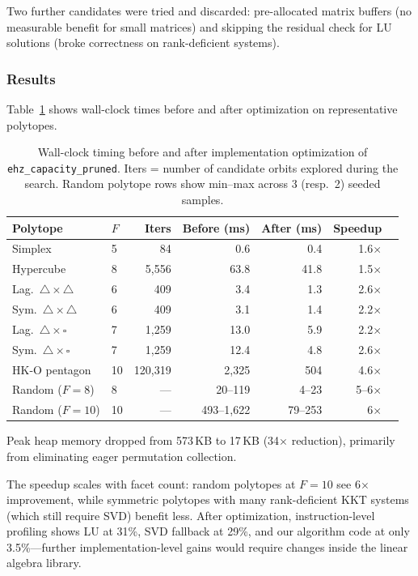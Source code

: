 Two further candidates were tried and discarded: pre-allocated matrix buffers
(no measurable benefit for small matrices) and skipping the residual check
for LU solutions (broke correctness on rank-deficient systems).

\subsubsection*{Results}

Table~\ref{tab:hk2017-opt-timing} shows wall-clock times before and after
optimization on representative polytopes.

\begin{table}[h]
\centering
\begin{tabular}{llrrrrr}
\toprule
Polytope & $F$ & Iters & Before (ms) & After (ms) & Speedup \\
\midrule
Simplex           &  5 &       84 &     0.6 &     0.4 & 1.6$\times$ \\
Hypercube         &  8 &    5{,}556 &    63.8 &    41.8 & 1.5$\times$ \\
Lag.\ $\triangle{\times}\triangle$ &  6 &      409 &     3.4 &     1.3 & 2.6$\times$ \\
Sym.\ $\triangle{\times}\triangle$ &  6 &      409 &     3.1 &     1.4 & 2.2$\times$ \\
Lag.\ $\triangle{\times}\square$   &  7 &    1{,}259 &    13.0 &     5.9 & 2.2$\times$ \\
Sym.\ $\triangle{\times}\square$   &  7 &    1{,}259 &    12.4 &     4.8 & 2.6$\times$ \\
HK-O pentagon     & 10 & 120{,}319 & 2{,}325 &      504 & 4.6$\times$ \\
Random ($F{=}8$)  &  8 &      --- &  20--119 &    4--23 & 5--6$\times$ \\
Random ($F{=}10$) & 10 &      --- & 493--1{,}622 &  79--253 & 6$\times$ \\
\bottomrule
\end{tabular}
\caption{Wall-clock timing before and after implementation optimization
  of \texttt{ehz\_capacity\_pruned}. Iters = number of candidate orbits
  explored during the search. Random polytope rows show min--max across
  3 (resp.\ 2) seeded samples.}
\label{tab:hk2017-opt-timing}
\end{table}

Peak heap memory dropped from 573\,KB to 17\,KB (34$\times$ reduction),
primarily from eliminating eager permutation collection.

The speedup scales with facet count: random polytopes at $F = 10$ see
6$\times$ improvement, while symmetric polytopes with many rank-deficient
KKT systems (which still require SVD) benefit less.
After optimization, instruction-level profiling shows LU at 31\%,
SVD fallback at 29\%, and our algorithm code at only 3.5\%---further
implementation-level gains would require changes inside the linear algebra
library.
